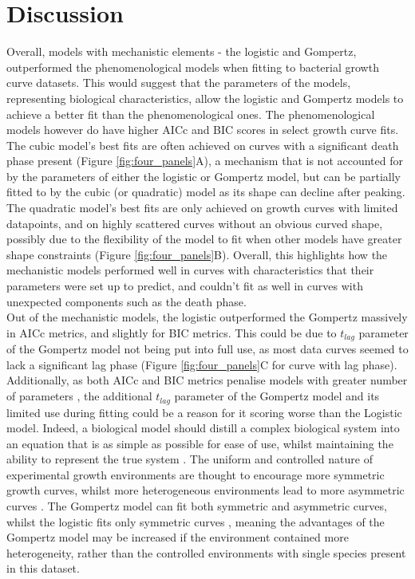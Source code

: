 \documentclass[11pt, letterpaper]{article}
\begin{document}
\section{Discussion}
\noindent Overall, models with mechanistic elements - the logistic and Gompertz, outperformed the phenomenological models when fitting to bacterial growth curve datasets. This would suggest that the parameters of the models, representing biological characteristics, allow the logistic and Gompertz models to achieve a better fit than the phenomenological ones. The phenomenological models however do have higher AICc and BIC scores in select growth curve fits. The cubic model's best fits are often achieved on curves with a significant death phase present (Figure \ref{fig:four_panels}A), a mechanism that is not accounted for by the parameters of either the logistic or Gompertz model, but can be partially fitted to by the cubic (or quadratic) model as its shape can decline after peaking. The quadratic model's best fits are only achieved on growth curves with limited datapoints, and on highly scattered curves without an obvious curved shape, possibly due to the flexibility of the model to fit when other models have greater shape constraints (Figure \ref{fig:four_panels}B). Overall, this highlights how the mechanistic models performed well in curves with characteristics that their parameters were set up to predict, and couldn't fit as well in curves with unexpected components such as the death phase.\\

\noindent Out of the mechanistic models, the logistic outperformed the Gompertz massively in AICc metrics, and slightly for BIC metrics. This could be due to $t_{lag}$ parameter of the Gompertz model not being put into full use, as most data curves seemed to lack a significant lag phase (Figure \ref{fig:four_panels}C for curve with lag phase). Additionally, as both AICc and BIC metrics penalise models with greater number of parameters \citep{burnham&Anderson_2004}, the additional $t_{lag}$ parameter of the Gompertz model and its limited use during fitting could be a reason for it scoring worse than the Logistic model. Indeed, a biological model should distill a complex biological system into an equation that is as simple as possible for ease of use, whilst maintaining the ability to represent the true system \citep{transtrum_bridging_2016}. The uniform and controlled nature of experimental growth environments are thought to encourage more symmetric growth curves, whilst more heterogeneous environments lead to more asymmetric curves \citep{peleg_modeling_1997}. The Gompertz model can fit both symmetric and asymmetric curves, whilst the logistic fits only symmetric curves \citep{peleg_modeling_1997}, meaning the advantages of the Gompertz model may be increased if the environment contained more heterogeneity, rather than the controlled environments with single species present in this dataset. \\
\end{document}
